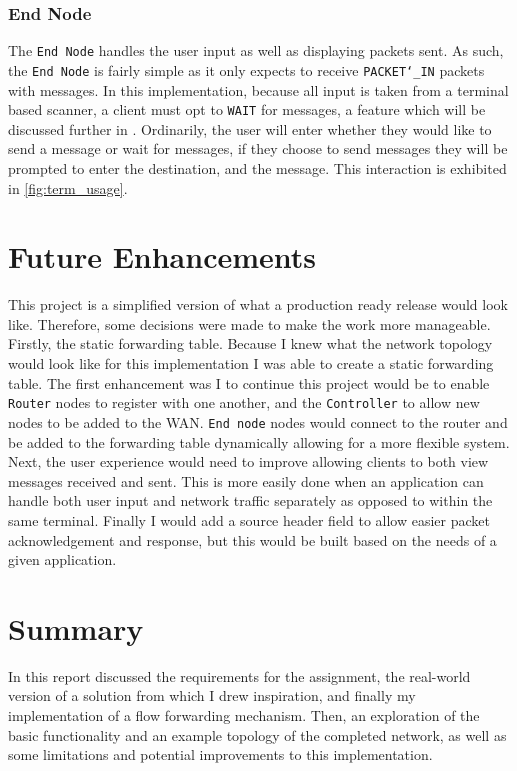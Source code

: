 \documentclass{article}
\newcommand{\code}[1]{\texttt{#1}}
\begin{document}
\subsubsection{End Node}
\label{subsec:EndNode}
The \code{End Node} handles the user input as well as displaying packets sent. As such, the \code{End Node} is fairly simple as it only expects to receive \code{PACKET\char`_IN} packets with messages. In this implementation, because all input is taken from a terminal based scanner, a client must opt to \code{WAIT} for messages, a feature which will be discussed further in . Ordinarily, the user will enter whether they would like to send a message or wait for messages, if they choose to send messages they will be prompted to enter the destination, and the message. This interaction is exhibited in \autoref{fig:term_usage}.

\section{Future Enhancements}
\label{sec:future_enhancements}
This project is a simplified version of what a production ready release would look like. Therefore, some decisions were made to make the work more manageable. Firstly, the static forwarding table. Because I knew what the network topology would look like for this implementation I was able to create a static forwarding table. The first enhancement was I to continue this project would be to enable \code{Router} nodes to register with one another, and the \code{Controller} to allow new nodes to be added to the WAN. \code{End node} nodes would connect to the router and be added to the forwarding table dynamically allowing for a more flexible system. Next, the user experience would need to improve allowing clients to both view messages received and sent. This is more easily done when an application can handle both user input and network traffic separately as opposed to within the same terminal. Finally I would add a source header field to allow easier packet acknowledgement and response, but this would be built based on the needs of a given application.

\section{Summary}
In this report discussed the requirements for the assignment, the real-world version of a solution from which I drew inspiration, and finally my implementation of a flow forwarding mechanism. Then, an exploration of the basic functionality and an example topology of the completed network, as well as some limitations and potential improvements to this implementation.
\end{document}
